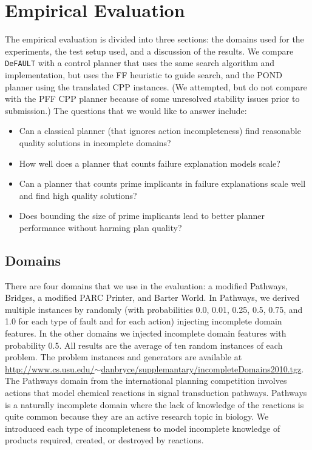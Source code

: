 \documentclass{article}
\def\citep#1{\cite{#1}}
\def\FFRISKY{{\tt DeFAULT}}
\begin{document}
\section{Empirical Evaluation}\label{sec:empirical}
%
The empirical evaluation is divided into three sections:  the domains used for the experiments, the test setup used, and a discussion of the results. We compare \FFRISKY{} with a control planner that uses the same search algorithm and implementation, but uses the FF heuristic to guide search, and the POND planner using the translated CPP instances. (We attempted, but do not compare with the PFF \citep{pff} CPP planner because of some unresolved stability issues prior to submission.)  The questions that we would like to answer include: 
\begin{itemize}
\item Can a classical planner (that ignores action incompleteness) find reasonable quality solutions in incomplete domains?
\item How well does a planner that counts failure explanation models scale?
\item Can a planner that counts prime implicants in failure explanations scale well and find high quality solutions?
\item Does bounding the size of prime implicants lead to better planner performance without harming plan quality?
\end{itemize}







\subsection{Domains} There are four domains that we use in the evaluation: a modified Pathways, Bridges,  a modified PARC Printer, and Barter World.  In Pathways, we derived multiple instances by randomly (with probabilities 0.0, 0.01, 0.25, 0.5, 0.75, and 1.0 for each type of fault and for each action) injecting incomplete domain features.  In the other domains we injected incomplete domain features with probability 0.5. All results are the average of ten random instances of each problem. 
The problem instances and generators are available at \href{http://www.cs.usu.edu/~danbryce/supplemantary/incompleteDomains2010.tgz}{http://www.cs.usu.edu/$\sim$danbryce/supplemantary/incompleteDomains2010.tgz}.  
The Pathways domain from the international planning competition involves actions that model chemical reactions in signal transduction pathways.  Pathways is a naturally incomplete domain where the lack of knowledge of the reactions is quite common because they are an active research topic in biology.  We introduced each type of incompleteness to model incomplete knowledge of products required, created, or destroyed by reactions.
\end{document}
